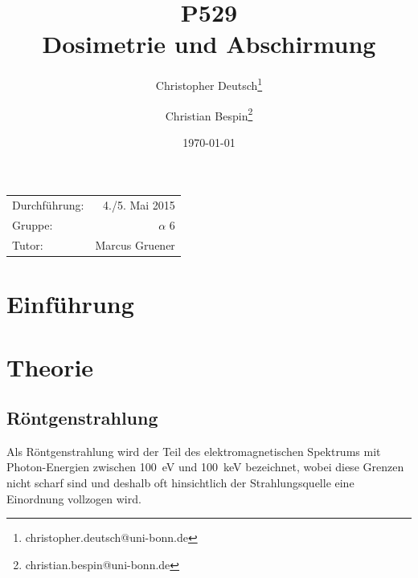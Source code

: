 \documentclass[11pt, a4paper]{article}
\title{P529 \\ Dosimetrie und Abschirmung}
\author{Christopher Deutsch\footnote{christopher.deutsch@uni-bonn.de} \and Christian Bespin\footnote{christian.bespin@uni-bonn.de}}
\date{\today}
\numberwithin{equation}{section}
\begin{document}
\begin{titlepage}

\maketitle

\begin{center}
\begin{tabular}{l r}
Durchführung: & 4./5. Mai 2015 \\
Gruppe: & $\alpha$ 6 \\
Tutor: & Marcus Gruener
\end{tabular}
\end{center}

\begin{abstract}
\noindent
\end{abstract}

\end{titlepage}

\tableofcontents
\newpage


\section{Einführung}

\section{Theorie}
\subsection{Röntgenstrahlung}
Als Röntgenstrahlung wird der Teil des elektromagnetischen Spektrums mit Photon-Energien zwischen \SI{100}{\electronvolt} und \SI{100}{\kilo\electronvolt} bezeichnet, wobei diese Grenzen nicht scharf sind und deshalb oft hinsichtlich der Strahlungsquelle eine Einordnung vollzogen wird.
\end{document}
